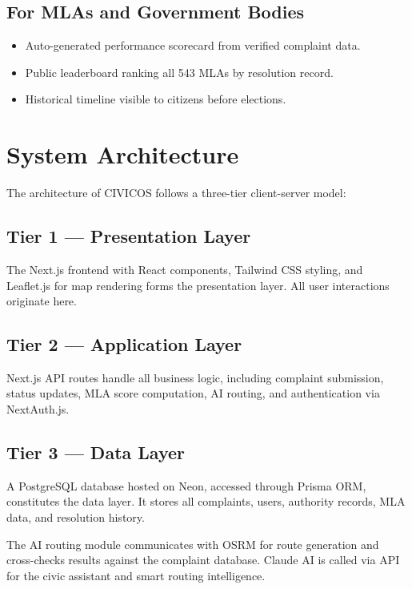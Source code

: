 \documentclass[12pt,a4paper]{report}
\begin{document}
\subsection{For MLAs and Government Bodies}

\begin{itemize}
    \item Auto-generated performance scorecard from verified complaint data.
    \item Public leaderboard ranking all 543 MLAs by resolution record.
    \item Historical timeline visible to citizens before elections.
\end{itemize}

\section{System Architecture}

The architecture of CIVICOS follows a three-tier client-server model:

\subsection{Tier 1 --- Presentation Layer}

The Next.js frontend with React components, Tailwind CSS styling, and
Leaflet.js for map rendering forms the presentation layer. All user
interactions originate here.

\subsection{Tier 2 --- Application Layer}

Next.js API routes handle all business logic, including complaint submission,
status updates, MLA score computation, AI routing, and authentication via
NextAuth.js.

\subsection{Tier 3 --- Data Layer}

A PostgreSQL database hosted on Neon, accessed through Prisma ORM, constitutes
the data layer. It stores all complaints, users, authority records, MLA data,
and resolution history.

The AI routing module communicates with OSRM for route generation and
cross-checks results against the complaint database. Claude AI is called via
API for the civic assistant and smart routing intelligence.
\end{document}
